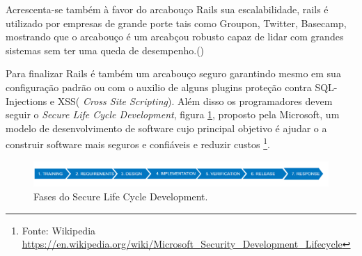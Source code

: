 \par Acrescenta-se também à favor do arcabouço Rails sua escalabilidade, rails é utilizado por empresas de grande porte  tais como Groupon, Twitter, Basecamp, mostrando que o arcabouço é um arcabçou robusto capaz de lidar com grandes sistemas  sem ter uma queda de desempenho.(\cite{lilia:16})
\par Para finalizar Rails é também um arcabouço seguro garantindo mesmo em sua configuração padrão ou com o auxilio de alguns plugins proteção contra SQL-Injections e XSS( \emph{Cross Site Scripting}). Além disso os programadores devem seguir o \emph{Secure Life Cycle Development}, figura  \ref{fig:security_dev_lifecycle}, proposto pela Microsoft, um modelo de desenvolvimento de software cujo principal objetivo é ajudar o a construir software mais seguros e confiáveis e reduzir custos \footnote{Fonte: Wikipedia \url{https://en.wikipedia.org/wiki/Microsoft_Security_Development_Lifecycle}}.
\begin{figure}[htb]
\includegraphics[width=15cm]{figuras/security_dev_lifecycle}
\caption{\label{fig:security_dev_lifecycle} Fases do Secure Life Cycle Development.}
\end{figure}
